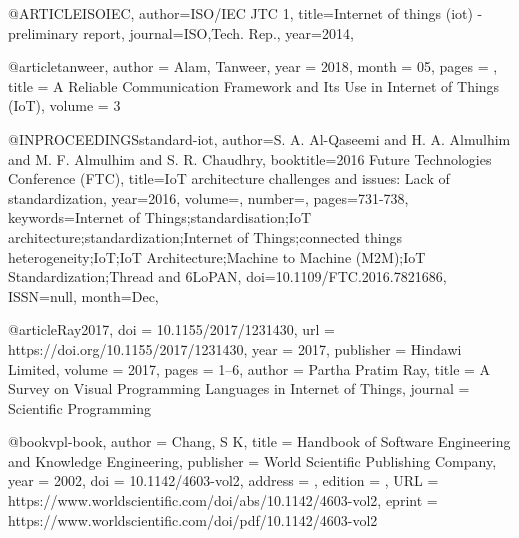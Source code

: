 @ARTICLE{ISOIEC,
author={ISO/IEC  JTC  1},
title={Internet  of  things  (iot)  -  preliminary  report},
journal={ISO,Tech. Rep.},
year={2014},
}

@article{tanweer,
author = {Alam, Tanweer},
year = {2018},
month = {05},
pages = {},
title = {A Reliable Communication Framework and Its Use in Internet of Things (IoT)},
volume = {3}
}

@INPROCEEDINGS{standard-iot,
author={S. A. {Al-Qaseemi} and H. A. {Almulhim} and M. F. {Almulhim} and S. R. {Chaudhry}},
booktitle={2016 Future Technologies Conference (FTC)},
title={IoT architecture challenges and issues: Lack of standardization},
year={2016},
volume={},
number={},
pages={731-738},
keywords={Internet of Things;standardisation;IoT architecture;standardization;Internet of Things;connected things heterogeneity;IoT;IoT Architecture;Machine to Machine (M2M);IoT Standardization;Thread and 6LoPAN},
doi={10.1109/FTC.2016.7821686},
ISSN={null},
month={Dec},}


@article{Ray2017,
  doi = {10.1155/2017/1231430},
  url = {https://doi.org/10.1155/2017/1231430},
  year = {2017},
  publisher = {Hindawi Limited},
  volume = {2017},
  pages = {1--6},
  author = {Partha Pratim Ray},
  title = {A Survey on Visual Programming Languages in Internet of Things},
  journal = {Scientific Programming}
}

@book{vpl-book,
author = {Chang, S K},
title = {Handbook of Software Engineering and Knowledge Engineering},
publisher = {World Scientific Publishing Company},
year = {2002},
doi = {10.1142/4603-vol2},
address = {},
edition   = {},
URL = {https://www.worldscientific.com/doi/abs/10.1142/4603-vol2},
eprint = {https://www.worldscientific.com/doi/pdf/10.1142/4603-vol2}
}


